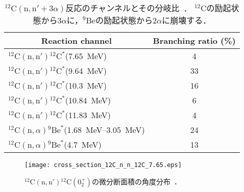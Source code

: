 \documentclass[../master]{subfiles}
\begin{document}
\begin{table}
  \centering
  \caption[${}^{12}\mathrm{C}(\mathrm{n},\mathrm{n}'+3\alpha)$反応のチャンネルとその分岐比．]
          {${}^{12}\mathrm{C}(\mathrm{n},\mathrm{n}'+3\alpha)$反応のチャンネルとその分岐比~\cite{kondoetal}．
            ${}^{12}\mathrm{C}$の励起状態から$3\alpha$に，${}^{9}\mathrm{Be}$の励起状態から$2\alpha$に崩壊する．}
  \label{tab::branchingratio}
  \begin{tabular}{lc}
    \toprule
    \multicolumn{1}{c}{Reaction channel} & Branching ratio (\%)\\
    \midrule
    ${}^{12}\mathrm{C}(\mathrm{n},\mathrm{n}'){}^{12}\mathrm{C}^{*}$(\SI{7.65}{\mega\electronvolt}) & 4\\
    ${}^{12}\mathrm{C}(\mathrm{n},\mathrm{n}'){}^{12}\mathrm{C}^{*}$(\SI{9.64}{\mega\electronvolt}) & 33\\
    ${}^{12}\mathrm{C}(\mathrm{n},\mathrm{n}'){}^{12}\mathrm{C}^{*}$(\SI{10.3}{\mega\electronvolt}) & 16\\
    ${}^{12}\mathrm{C}(\mathrm{n},\mathrm{n}'){}^{12}\mathrm{C}^{*}$(\SI{10.84}{\mega\electronvolt}) & 6\\
    ${}^{12}\mathrm{C}(\mathrm{n},\mathrm{n}'){}^{12}\mathrm{C}^{*}$(\SI{11.83}{\mega\electronvolt}) & 4\\
    ${}^{12}\mathrm{C}(\mathrm{n},\alpha){}^{9}\mathrm{Be}^{*}$(\SIrange{1.68}{3.05}{\mega\electronvolt}) & 24\\
    ${}^{12}\mathrm{C}(\mathrm{n},\alpha){}^{9}\mathrm{Be}^{*}$(\SI{4.7}{\mega\electronvolt}) & 13\\
    \bottomrule
  \end{tabular}
\end{table}

\begin{figure}
  \centering
  \texttt{[image: cross\_section\_12C\_n\_n\_12C\_7.65.eps]}
  \caption[${}^{12}\mathrm{C}(\mathrm{n},\mathrm{n}'){}^{12}\mathrm{C} (0_2^+)$の微分断面積の角度分布．]
          {${}^{12}\mathrm{C}(\mathrm{n},\mathrm{n}'){}^{12}\mathrm{C} (0_2^+)$の微分断面積の角度分布~\cite{kondoetal}．}
  \label{fig::sig_angle_dist}
\end{figure}
\end{document}
